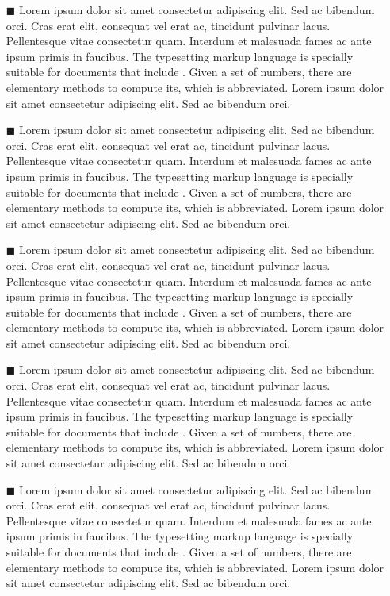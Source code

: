 \documentclass[./main.tex]{subfiles}
\begin{document}
\begin{itemize}
    \item[$\blacksquare$] Lorem ipsum dolor sit amet consectetur adipiscing elit. Sed ac bibendum orci. Cras erat elit, consequat vel erat ac, tincidunt pulvinar lacus. Pellentesque vitae consectetur quam. Interdum et malesuada fames ac ante ipsum primis in faucibus. The typesetting markup language is specially suitable for documents that include . Given a set of numbers, there are elementary methods to compute its, which is abbreviated. Lorem ipsum dolor sit amet consectetur adipiscing elit. Sed ac bibendum orci.
    \item[$\blacksquare$] Lorem ipsum dolor sit amet consectetur adipiscing elit. Sed ac bibendum orci. Cras erat elit, consequat vel erat ac, tincidunt pulvinar lacus. Pellentesque vitae consectetur quam. Interdum et malesuada fames ac ante ipsum primis in faucibus. The typesetting markup language is specially suitable for documents that include . Given a set of numbers, there are elementary methods to compute its, which is abbreviated. Lorem ipsum dolor sit amet consectetur adipiscing elit. Sed ac bibendum orci.
    \item[$\blacksquare$] Lorem ipsum dolor sit amet consectetur adipiscing elit. Sed ac bibendum orci. Cras erat elit, consequat vel erat ac, tincidunt pulvinar lacus. Pellentesque vitae consectetur quam. Interdum et malesuada fames ac ante ipsum primis in faucibus. The typesetting markup language is specially suitable for documents that include . Given a set of numbers, there are elementary methods to compute its, which is abbreviated. Lorem ipsum dolor sit amet consectetur adipiscing elit. Sed ac bibendum orci. 
    \item[$\blacksquare$] Lorem ipsum dolor sit amet consectetur adipiscing elit. Sed ac bibendum orci. Cras erat elit, consequat vel erat ac, tincidunt pulvinar lacus. Pellentesque vitae consectetur quam. Interdum et malesuada fames ac ante ipsum primis in faucibus. The typesetting markup language is specially suitable for documents that include . Given a set of numbers, there are elementary methods to compute its, which is abbreviated. Lorem ipsum dolor sit amet consectetur adipiscing elit. Sed ac bibendum orci.
    \item[$\blacksquare$] Lorem ipsum dolor sit amet consectetur adipiscing elit. Sed ac bibendum orci. Cras erat elit, consequat vel erat ac, tincidunt pulvinar lacus. Pellentesque vitae consectetur quam. Interdum et malesuada fames ac ante ipsum primis in faucibus. The typesetting markup language is specially suitable for documents that include . Given a set of numbers, there are elementary methods to compute its, which is abbreviated. Lorem ipsum dolor sit amet consectetur adipiscing elit. Sed ac bibendum orci.  
\end{itemize}
\end{document}
